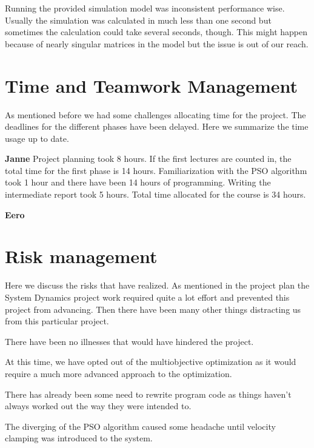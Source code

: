 \documentclass[twoside]{article}
\begin{document}
\begin{multicols}{2}
Running the provided simulation model was inconsistent performance wise. Usually the simulation was calculated in much less than one second but sometimes the calculation could take several seconds, though. This might happen because of nearly singular matrices in the model but the issue is out of our reach.



\section{Time and Teamwork Management}

As mentioned before we had some challenges allocating time for the project. The deadlines for the different phases have been delayed. Here we summarize the time usage up to date.

\textbf{Janne} Project planning took 8 hours. If the first lectures are counted in, the total time for the first phase is 14 hours. Familiarization with the PSO algorithm took 1 hour and there have been 14 hours of programming. Writing the intermediate report took 5 hours. Total time allocated for the course is 34 hours.

\textbf{Eero}








\section{Risk management}

Here we discuss the risks that have realized. As mentioned in the project plan the System Dynamics project work required quite a lot effort and prevented this project from advancing. Then there have been many other things distracting us from this particular project.

There have been no illnesses that would have hindered the project.

At this time, we have opted out of the multiobjective optimization as it would require a much more advanced approach to the optimization.

There has already been some need to rewrite program code as things haven't always worked out the way they were intended to.

The diverging of the PSO algorithm caused some headache until velocity clamping was introduced to the system. 


\end{multicols}
\end{document}
